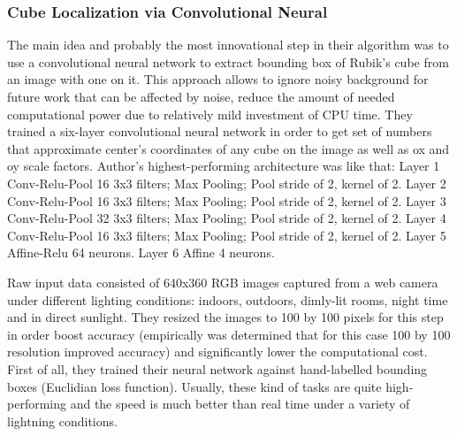 \documentclass[../../main]{subfiles}
\begin{document}
\subsubsection{Cube Localization via Convolutional Neural}
The main idea and probably the most innovational step in their algorithm was to use a convolutional neural network to extract bounding box of Rubik’s cube from an image with one on it. This approach allows to ignore noisy background for future work that can be affected by noise, reduce the amount of needed computational power due to relatively mild investment of CPU time.
They trained a six-layer convolutional neural network in order to get set of numbers that approximate center’s coordinates of any cube on the image as well as ox and oy scale factors.
Author’s highest-performing architecture was like that:
Layer 1
Conv-Relu-Pool 16 3x3 filters; Max Pooling; Pool stride of 2, kernel of 2.
Layer 2
Conv-Relu-Pool 16 3x3 filters; Max Pooling; Pool stride of 2, kernel of 2.
Layer 3
Conv-Relu-Pool 32 3x3 filters; Max Pooling; Pool stride of 2, kernel of 2.
Layer 4
Conv-Relu-Pool 16 3x3 filters; Max Pooling; Pool stride of 2, kernel of 2.
Layer 5
Affine-Relu 64 neurons.
Layer 6
Affine 4 neurons.

Raw input data consisted of 640x360 RGB images captured from a web camera under different lighting conditions: indoors, outdoors, dimly-lit rooms, night time and in direct sunlight. They resized the images to 100 by 100 pixels for this step in order boost accuracy (empirically was determined that for this case 100 by 100 resolution improved accuracy) and significantly lower the computational cost. First of all, they trained their neural network against hand-labelled bounding boxes (Euclidian loss function). Usually, these kind of tasks are quite high-performing and the speed is much better than real time under a variety of lightning conditions. 
\end{document}
